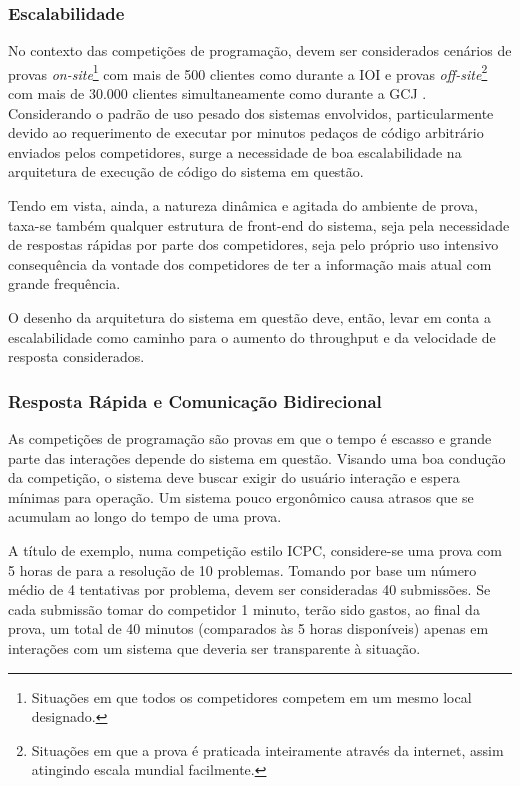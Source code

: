 \documentclass[ruledheader]{abnt}
\begin{document}
\subsubsection{Escalabilidade}

No contexto das competições de programação, devem ser considerados cenários de provas \emph{on-site}\footnote{Situações em que todos os competidores competem em um mesmo local designado.} com mais de 500 clientes como durante a IOI \cite{ioi-nl1-2007} e provas \emph{off-site}\footnote{Situações em que a prova é praticada inteiramente através da internet, assim atingindo escala mundial facilmente.} com mais de 30.000 clientes simultaneamente como durante a GCJ \cite{googlecodejamhistory}.  Considerando o padrão de uso pesado dos sistemas envolvidos, particularmente devido ao requerimento de executar por minutos pedaços de código arbitrário enviados pelos competidores, surge a necessidade de boa escalabilidade na arquitetura de execução de código do sistema em questão.

Tendo em vista, ainda, a natureza dinâmica e agitada do ambiente de prova, taxa-se também qualquer estrutura de front-end do sistema, seja pela necessidade de respostas rápidas por parte dos competidores, seja pelo próprio uso intensivo consequência da vontade dos competidores de ter a informação mais atual com grande frequência.

O desenho da arquitetura do sistema em questão deve, então, levar em conta a escalabilidade como caminho para o aumento do throughput e da velocidade de resposta considerados.

\subsubsection{Resposta Rápida e Comunicação Bidirecional}

As competições de programação são provas em que o tempo é escasso e grande parte das interações depende do sistema em questão. Visando uma boa condução da competição, o sistema deve buscar exigir do usuário interação e espera mínimas para operação. Um sistema pouco ergonômico causa atrasos que se acumulam ao longo do tempo de uma prova.

A título de exemplo, numa competição estilo ICPC, considere-se uma prova com 5 horas de para a resolução de 10 problemas. Tomando por base um número médio de 4 tentativas por problema, devem ser consideradas 40 submissões. Se cada submissão tomar do competidor 1 minuto, terão sido gastos, ao final da prova, um total de 40 minutos (comparados às 5 horas disponíveis) apenas em interações com um sistema que deveria ser transparente à situação.
\end{document}
